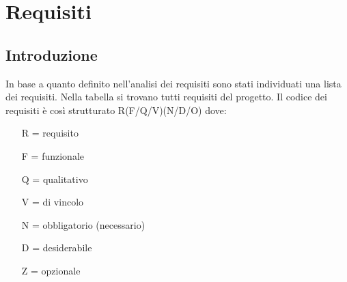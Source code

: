 
\section{Requisiti}
\subsection{Introduzione}
In base a quanto definito nell'analisi dei requisiti sono stati individuati una lista dei requisiti. Nella tabella si trovano tutti requisiti del progetto.
Il codice dei requisiti è così strutturato R(F/Q/V)(N/D/O) dove:
\begin{enumerate}
	\item[R =] requisito
    \item[F =] funzionale
    \item[Q =] qualitativo
    \item[V =] di vincolo
    \item[N =] obbligatorio (necessario)
    \item[D =] desiderabile
    \item[Z =] opzionale
\end{enumerate}
